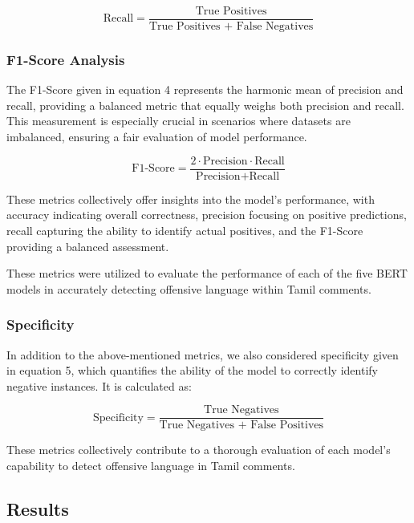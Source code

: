 \documentclass{svproc}
\begin{document}
\begin{equation}
\text{Recall} = \frac{\text{True Positives}}{\text{True Positives + False Negatives}} \label{eq:recall}
\end{equation}


\subsubsection{F1-Score Analysis}

The F1-Score given in equation 4 represents the harmonic mean of precision and recall, providing a balanced metric that equally weighs both precision and recall. This measurement is especially crucial in scenarios where datasets are imbalanced, ensuring a fair evaluation of model performance.


\begin{equation}
\text{F1-Score} = \frac{2 \cdot \text{Precision} \cdot \text{Recall}}{\text{Precision} + \text{Recall}} \label{eq:f1score}
\end{equation}


These metrics collectively offer insights into the model's performance, with accuracy indicating overall correctness, precision focusing on positive predictions, recall capturing the ability to identify actual positives, and the F1-Score providing a balanced assessment.

These metrics were utilized to evaluate the performance of each of the five BERT models in accurately detecting offensive language within Tamil comments.


\subsubsection{Specificity}

In addition to the above-mentioned metrics, we also considered specificity given in equation 5, which quantifies the ability of the model to correctly identify negative instances. It is calculated as:

\begin{equation}
\text{Specificity} = \frac{\text{True Negatives}}{\text{True Negatives + False Positives}} \label{eq:specificity}
\end{equation}


These metrics collectively contribute to a thorough evaluation of each model's capability to detect offensive language in Tamil comments.

\subsection{Results}
\end{document}
